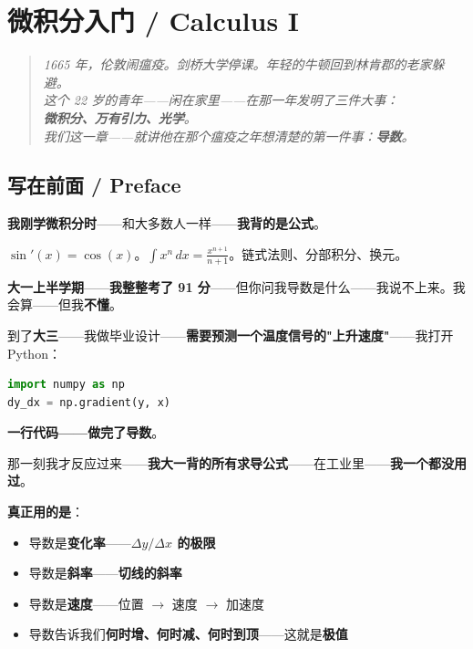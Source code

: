 
\chapter{微积分入门 / Calculus I}
\label{ch:calc1}

\begin{quote}\itshape
1665 年，伦敦闹瘟疫。剑桥大学停课。年轻的牛顿回到林肯郡的老家躲避。\\
这个 22 岁的青年——闲在家里——在那一年发明了三件大事：\\
\textbf{微积分、万有引力、光学}。\\
我们这一章——就讲他在那个瘟疫之年想清楚的第一件事：\textbf{导数}。
\end{quote}

\section{写在前面 / Preface}

\textbf{我刚学微积分时}——和大多数人一样——\textbf{我背的是公式}。

$\sin'(x) = \cos(x)$。$\int x^n \, dx = \frac{x^{n+1}}{n+1}$。链式法则、分部积分、换元。

\textbf{大一上半学期}——\textbf{我整整考了 91 分}——但你问我导数是什么——我说不上来。我会算——但我\textbf{不懂}。

到了\textbf{大三}——我做毕业设计——\textbf{需要预测一个温度信号的"上升速度"}——我打开 Python：

\begin{lstlisting}[language=Python]
import numpy as np
dy_dx = np.gradient(y, x)
\end{lstlisting}

\textbf{一行代码——做完了导数}。

那一刻我才反应过来——\textbf{我大一背的所有求导公式}——在工业里——\textbf{我一个都没用过}。

\textbf{真正用的是}：

\begin{itemize}
\item 导数是\textbf{变化率}——\textbf{$\Delta y / \Delta x$ 的极限}
\item 导数是\textbf{斜率}——\textbf{切线的斜率}
\item 导数是\textbf{速度}——位置 $\to$ 速度 $\to$ 加速度
\item 导数告诉我们\textbf{何时增、何时减、何时到顶}——这就是\textbf{极值}
\end{itemize}

